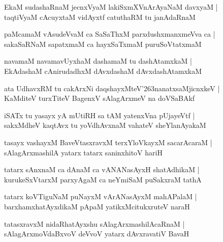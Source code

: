 \documentclass[twoside,12pt,openright]{book}
\def\S{\char'263}
\newcounter{shloka}[chapter]
\begin{document}
\begin{shloka}%
EkaM sudashaRnaM jecnxVyaM lakiSxmXVnArAyaNaM davxyaM |\\
taqtiVyaM cAcuyxtaM vidAyxtf catuthaRM tu janAdaRnaM 
\end{shloka}

\begin{shloka}%
paMcamaM vAsudeVvaM ca SaSaThxM parxdushxmanxmeVva ca |\\
sakaSaRNaM sapatxmaM ca hayxSaTxmaM puruSoVtatxmaM
\end{shloka}

\begin{shloka}%
navamaM navamavUyxhaM dashamaM tu dashAtamxkaM |\\
EkAdashaM cAnirudadhxM dAvxdashaM dAvxdashAtamxkaM 
\end{shloka}

\begin{shloka}%
ata UdhavxRM tu cakArxNi daqshayxMteV\S nanatxsaMjicnxkeV |\\
KaMditeV turxTiteV BagenxV sAlagArxmeV na doVSaBAkf 
\end{shloka}

\begin{shloka}%
iSATx tu yasayx yA mUtiRH sa tAM yatenxVna pUjayeVtf |\\
sakxMdheV kaqtAvx tu yoVdhAvxnaM vahateV sheYlanAyakaM 
\end{shloka}

\begin{shloka}%
tasayx vashayxM BaveVtasxravxM terxYloVkayxM sacarAcaraM |\\
sAlagArxmashilA yatarx tatarx saninxhitoV hariH 
\end{shloka}

\begin{shloka}%
tatarx sAnxnaM ca dAnaM ca vANANasAyxH shatAdhikaM |\\
kurukeSxVtarxM parxyAgaM ca neYmiSaM puSakxraM tathA 
\end{shloka}

\begin{shloka}%
tatarx koVTiguNaM puNayxM vArANasAyxM mahAPalaM |\\
barxhamxhatAyxdikaM pApaM yatikxMcitukxruteV naraH 
\end{shloka}

\begin{shloka}%
tatasxravxM nidaRhatAyxshu sAlagArxmashilAcaRnaM |\\
sAlagArxmoVdaBxvoV deVvoV yatarx dAvxravatiV BavaH 
\end{shloka}
\end{document}
